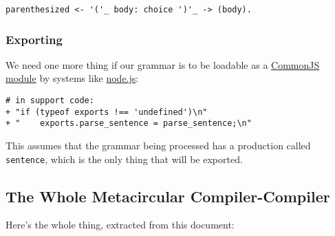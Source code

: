 \documentclass[
]{article}
\begin{document}
\begin{verbatim}
parenthesized <- '('_ body: choice ')'_ -> (body).
\end{verbatim}

\hypertarget{exporting}{%
\subsubsection{Exporting}\label{exporting}}

We need one more thing if our grammar is to be loadable as a
\href{http://wiki.commonjs.org/wiki/Modules/1.1\#Module_Context}{CommonJS
module} by systems like \href{http://nodejs.org/}{node.js}:

\begin{verbatim}
# in support code:
+ "if (typeof exports !== 'undefined')\n"
+ "    exports.parse_sentence = parse_sentence;\n"
\end{verbatim}

This assumes that the grammar being processed has a production called
\texttt{sentence}, which is the only thing that will be exported.

\hypertarget{the-whole-metacircular-compiler-compiler}{%
\subsection{The Whole Metacircular
Compiler-Compiler}\label{the-whole-metacircular-compiler-compiler}}

Here's the whole thing, extracted from this document:
\end{document}
